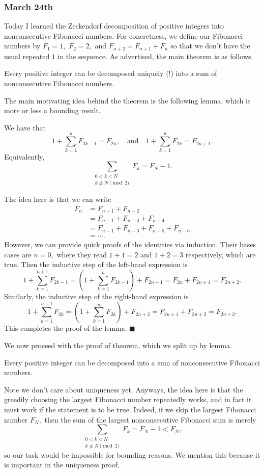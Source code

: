 \subsubsection{March 24th}
Today I learned the Zeckendorf decomposition of positive integers into nonconsecutive Fibonacci numbers. For concretness, we define our Fibonacci numbers by $F_1=1,$ $F_2=2,$ and $F_{n+2}=F_{n+1}+F_n$ so that we don't have the usual repeated $1$ in the sequence. As advertised, the main theorem is as follows.
\begin{theorem}
    Every positive integer can be decomposed uniquely (!) into a sum of nonconsecutive Fibonacci numbers.
\end{theorem}
The main motivating idea behind the theorem is the following lemma, which is more or less a bounding result.
\begin{lemma}
    We have that
    \[1+\sum_{k=1}^nF_{2k-1}=F_{2n},\quad\text{and}\quad1+\sum_{k=1}^nF_{2k}=F_{2n+1}.\]
    Equivalently,
    \[\sum_{\substack{0<k<N\\k\not\equiv N\pmod2}}F_k=F_N-1.\]
\end{lemma}
The idea here is that we can write
\begin{align*}
    F_n &= F_{n-1}+F_{n-2} \\
    &= F_{n-1}+F_{n-3}+F_{n-4} \\
    &= F_{n-1}+F_{n-3}+F_{n-5}+F_{n-6} \\
    &= \cdots.
\end{align*}
However, we can provide quick proofs of the identities via induction. Their bases cases are $n=0,$ where they read $1+1=2$ and $1+2=3$ respectively, which are true. Then the inductive step of the left-hand expression is
\[1+\sum_{k=1}^{n+1}F_{2k-1}=\left(1+\sum_{k=1}^nF_{2k-1}\right)+F_{2n+1}=F_{2n}+F_{2n+1}=F_{2n+2}.\]
Similarly, the inductive step of the right-hand expression is
\[1+\sum_{k=1}^{n+1}F_{2k}=\left(1+\sum_{k=1}^nF_{2k}\right)+F_{2n+2}=F_{2n+1}+F_{2n+2}=F_{2n+3}.\]
This completes the proof of the lemma. $\blacksquare$

We now proceed with the proof of theorem, which we split up by lemma.
\begin{lemma}
    Every positive integer can be decomposed into a sum of nonconsecutive Fibonacci numbers.
\end{lemma}
Note we don't care about uniqueness yet. Anyways, the idea here is that the greedily choosing the largest Fibonacci number repeatedly works, and in fact it must work if the statement is to be true. Indeed, if we skip the largest Fibonacci number $F_N,$ then the sum of the largest nonconsecutive Fibonacci sum is merely
\[\sum_{\substack{0<k<N\\k\not\equiv N\pmod2}}F_k=F_N-1<F_N,\]
so our task would be impossible for bounding reasons. We mention this because it is important in the uniqueness proof.

